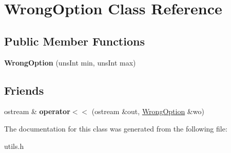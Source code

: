 \hypertarget{class_wrong_option}{}\section{Wrong\+Option Class Reference}
\label{class_wrong_option}
\subsection*{Public Member Functions}
\begin{DoxyCompactItemize}
\item 
\hypertarget{class_wrong_option_ad167d8d4a022b1069a78b0be521cb09f}{}\label{class_wrong_option_ad167d8d4a022b1069a78b0be521cb09f} 
{\bfseries Wrong\+Option} (uns\+Int min, uns\+Int max)
\end{DoxyCompactItemize}
\subsection*{Friends}
\begin{DoxyCompactItemize}
\item 
\hypertarget{class_wrong_option_a272717a9c47de3cdf605f30ccc0b7c08}{}\label{class_wrong_option_a272717a9c47de3cdf605f30ccc0b7c08} 
ostream \& {\bfseries operator$<$$<$} (ostream \&out, \hyperlink{class_wrong_option}{Wrong\+Option} \&wo)
\end{DoxyCompactItemize}


The documentation for this class was generated from the following file\+:\begin{DoxyCompactItemize}
\item 
utils.\+h\end{DoxyCompactItemize}
